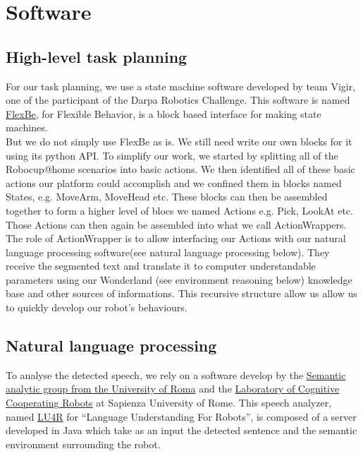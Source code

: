 \documentclass[runningheads,a4paper]{llncs}
\begin{document}
\section{Software}

\subsection{High-level task planning}
\tab For our task planning, we use a state machine software developed by team Vigir, one of the participant of the Darpa Robotics Challenge. This software is named \href{http://philserver.bplaced.net/fbe/index.php}{FlexBe}, for Flexible Behavior, is a block based interface for making state machines.\\

But we do not simply use FlexBe as is. We still need write our own blocks for it using its python API. To simplify our work, we started by splitting all of the Robocup@home scenarios into basic actions. We then identified all of these basic actions our platform could accomplish and we confined them in blocks named States, e.g. MoveArm, MoveHead etc. These blocks can then be assembled together to form a higher level of blocs we named Actions e.g. Pick, LookAt etc. Those Actions can then again be assembled into what we call ActionWrappers. The role of ActionWrapper is to allow interfacing our Actions with our natural language processing software(see natural language processing below). They receive the segmented text and translate it to computer understandable parameters using our Wonderland (see environment reasoning below) knowledge base and other sources of informations. This recursive structure allow us allow us to quickly develop our robot’s behaviours.

\subsection{Natural language processing}
\tab To analyse the detected speech, we rely on a software develop by the  \href{http://sag.art.uniroma2.it/}{Semantic analytic group from the University of Roma} and the \href{http://labrococo.dis.uniroma1.it/}{Laboratory of Cognitive Cooperating Robots} at Sapienza University of Rome. This speech analyzer, named \href{http://sag.art.uniroma2.it/lu4r.html}{LU4R} for “Language Understanding For Robots”, is composed of a server developed in Java which take as an input the detected sentence and the semantic environment surrounding the robot.\\
\end{document}

